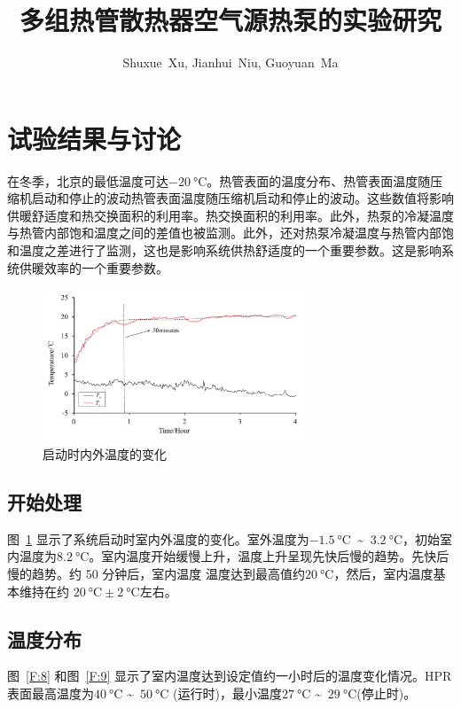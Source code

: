 

\title{多组热管散热器空气源热泵的实验研究}
\author{Shuxue~Xu, Jianhui~Niu, Guoyuan~Ma}


\maketitle




\section{试验结果与讨论}
在冬季，北京的最低温度可达$\qty{-20}{\degreeCelsius} $。热管表面的温度分布、热管表面温度随压缩机启动和停止的波动热管表面温度随压缩机启动和停止的波动。这些数值将影响供暖舒适度和热交换面积的利用率。热交换面积的利用率。此外，热泵的冷凝温度与热管内部饱和温度之间的差值也被监测。此外，还对热泵冷凝温度与热管内部饱和温度之差进行了监测，这也是影响系统供热舒适度的一个重要参数。这是影响系统供暖效率的一个重要参数。


\begin{figure}[htbp]
	\centering
	\includegraphics[width=0.7\textwidth]{picture/picture_7}
	\caption{启动时内外温度的变化}
	\label{F:7}
\end{figure}

\subsection{开始处理}
图~\ref{F:7} 显示了系统启动时室内外温度的变化。室外温度为$\qty{-1.5}{\degreeCelsius} $~\textasciitilde~$\qty{3.2}{\degreeCelsius} $，初始室内温度为$\qty{8.2}{\degreeCelsius} $。室内温度开始缓慢上升，温度上升呈现先快后慢的趋势。先快后慢的趋势。约 50 分钟后，室内温度
温度达到最高值约$\qty{20}{\degreeCelsius} $，然后，室内温度基本维持在约 
$\qty{20}{\degreeCelsius} \pm \qty{2}{\degreeCelsius} $左右。

\subsection{温度分布}
图~\ref{F:8} 和图~\ref{F:9} 显示了室内温度达到设定值约一小时后的温度变化情况。HPR 表面最高温度为$\qty{40}{\degreeCelsius} $ \textasciitilde~$\qty{50}{\degreeCelsius} $ (运行时)，最小温度$\qty{27}{\degreeCelsius} $ \textasciitilde~$\qty{29}{\degreeCelsius} $(停止时)。

